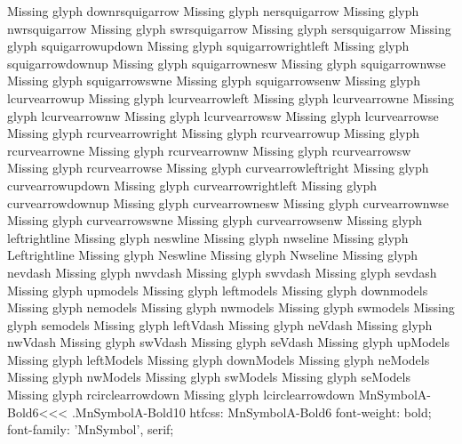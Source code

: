 Missing glyph	downrsquigarrow
Missing glyph	nersquigarrow
Missing glyph	nwrsquigarrow
Missing glyph	swrsquigarrow
Missing glyph	sersquigarrow
Missing glyph	squigarrowupdown
Missing glyph	squigarrowrightleft
Missing glyph	squigarrowdownup
Missing glyph	squigarrownesw
Missing glyph	squigarrownwse
Missing glyph	squigarrowswne
Missing glyph	squigarrowsenw
Missing glyph	lcurvearrowup
Missing glyph	lcurvearrowleft
Missing glyph	lcurvearrowne
Missing glyph	lcurvearrownw
Missing glyph	lcurvearrowsw
Missing glyph	lcurvearrowse
Missing glyph	rcurvearrowright
Missing glyph	rcurvearrowup
Missing glyph	rcurvearrowne
Missing glyph	rcurvearrownw
Missing glyph	rcurvearrowsw
Missing glyph	rcurvearrowse
Missing glyph	curvearrowleftright
Missing glyph	curvearrowupdown
Missing glyph	curvearrowrightleft
Missing glyph	curvearrowdownup
Missing glyph	curvearrownesw
Missing glyph	curvearrownwse
Missing glyph	curvearrowswne
Missing glyph	curvearrowsenw
Missing glyph	leftrightline
Missing glyph	neswline
Missing glyph	nwseline
Missing glyph	Leftrightline
Missing glyph	Neswline
Missing glyph	Nwseline
Missing glyph	nevdash
Missing glyph	nwvdash
Missing glyph	swvdash
Missing glyph	sevdash
Missing glyph	upmodels
Missing glyph	leftmodels
Missing glyph	downmodels
Missing glyph	nemodels
Missing glyph	nwmodels
Missing glyph	swmodels
Missing glyph	semodels
Missing glyph	leftVdash
Missing glyph	neVdash
Missing glyph	nwVdash
Missing glyph	swVdash
Missing glyph	seVdash
Missing glyph	upModels
Missing glyph	leftModels
Missing glyph	downModels
Missing glyph	neModels
Missing glyph	nwModels
Missing glyph	swModels
Missing glyph	seModels
Missing glyph	rcirclearrowdown
Missing glyph	lcirclearrowdown
\<MnSymbolA-Bold6\><<<
.MnSymbolA-Bold10
htfcss:  MnSymbolA-Bold6  font-weight: bold; font-family: 'MnSymbol', serif;

